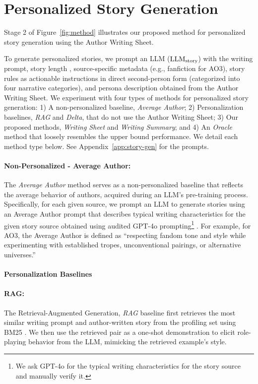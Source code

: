 \section{Personalized Story Generation}

Stage 2 of Figure~\ref{fig:method} illustrates our proposed method for personalized story generation using the Author Writing Sheet. 

To generate personalized stories, we prompt an LLM (\(\text{LLM\textsubscript{story}}\)) with the writing prompt, story length \citep{chakrabarty2024art}, source-specific metadata (e.g., fanfiction for AO3), story rules as actionable instructions in direct second-person form (categorized into four narrative categories), and persona description obtained from the Author Writing Sheet. 
%
We experiment with four types of methods for personalized story generation: 
1) A non-personalized baseline, \emph{Average Author}; 
2) Personalization baselines, \emph{RAG} and \emph{Delta}, that do not use the Author Writing Sheet; 
3) Our proposed methods, \emph{Writing Sheet} and \emph{Writing Summary}; 
and 
4) An \emph{Oracle} method that loosely resembles the upper bound performance. We detail each method type below.
See Appendix~\ref{app:story-gen} for the prompts. 


\paragraph{Non-Personalized - Average Author:}
\hypertarget{sec:avg-author}{}
The \emph{Average Author} method serves as a non-personalized baseline that reflects the average behavior of authors, acquired during an LLM's pre-training process. Specifically, for each given source, we prompt an LLM to generate stories using an Average Author prompt that describes typical writing characteristics for the given story source obtained using audited GPT-4o prompting\footnote{We ask GPT-4o for the typical writing characteristics for the story source and manually verify it.} \citep{wang-etal-2024-rolellm}. For example, for AO3, the Average Author is defined as ``respecting fandom tone and style while experimenting with established tropes, unconventional pairings, or alternative universes.'' 

\paragraph{Personalization Baselines}

\paragraph{RAG:}
\hypertarget{sec:rag}{}
The Retrieval-Augmented Generation, \emph{RAG} baseline \citep{salemi-etal-2024-lamp} first retrieves the most similar writing prompt and author-written story from the profiling set using BM25 \citep{robertson2009probabilistic}. We then use the retrieved pair as a one-shot demonstration \citep{wang-etal-2024-rolellm} to elicit role-playing behavior from the LLM, mimicking the retrieved example's style.

